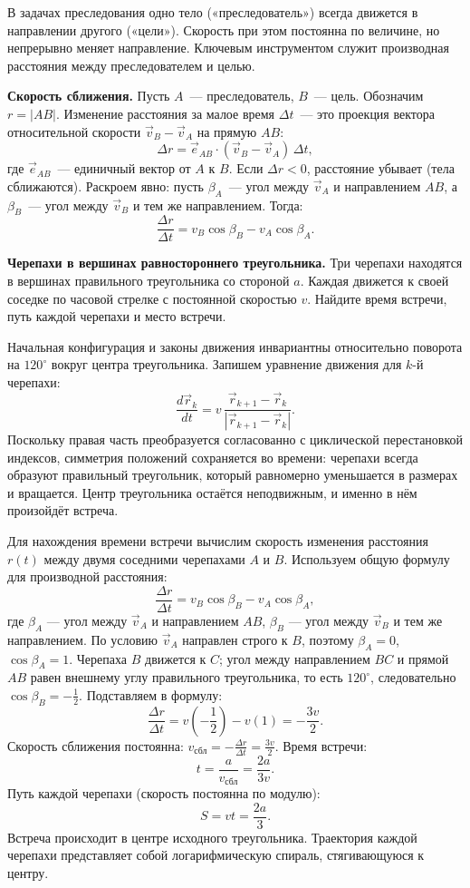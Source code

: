 \documentclass[../main.tex]{subfiles}
\begin{document}
В задачах преследования одно тело («преследователь») всегда движется
в направлении другого («цели»). Скорость при этом постоянна по величине,
но непрерывно меняет направление. Ключевым инструментом служит
производная расстояния между преследователем и целью.

\noindent\textbf{Скорость сближения.}
Пусть $A$~--- преследователь, $B$~--- цель. Обозначим $r = |AB|$.
Изменение расстояния за малое время $\Delta t$~--- это проекция вектора
относительной скорости $\vec{v}_B - \vec{v}_A$ на прямую $AB$:
\[
\Delta r = \vec{e}_{AB}\cdot(\vec{v}_B - \vec{v}_A)\,\Delta t,
\]
где $\vec{e}_{AB}$~--- единичный вектор от $A$ к $B$.
Если $\Delta r < 0$, расстояние убывает (тела сближаются).
Раскроем явно: пусть $\beta_A$~--- угол между $\vec{v}_A$ и направлением $AB$,
а $\beta_B$~--- угол между $\vec{v}_B$ и тем же направлением. Тогда:
\[
\frac{\Delta r}{\Delta t} = v_B\cos\beta_B - v_A\cos\beta_A.
\]

\begin{example}
\textbf{Черепахи в вершинах равностороннего треугольника.}
Три черепахи находятся в вершинах правильного треугольника со стороной $a$.
Каждая движется к своей соседке по часовой стрелке с постоянной скоростью $v$.
Найдите время встречи, путь каждой черепахи и место встречи.

Начальная конфигурация и законы движения инвариантны относительно поворота на $120^\circ$
вокруг центра треугольника. Запишем уравнение движения для $k$-й черепахи:
\[
\frac{d\vec{r}_k}{dt} = v\,\frac{\vec{r}_{k+1} - \vec{r}_k}{|\vec{r}_{k+1} - \vec{r}_k|}.
\]
Поскольку правая часть преобразуется согласованно с циклической перестановкой индексов,
симметрия положений сохраняется во времени: черепахи всегда образуют правильный треугольник,
который равномерно уменьшается в размерах и вращается. Центр треугольника остаётся
неподвижным, и именно в нём произойдёт встреча.

Для нахождения времени встречи вычислим скорость изменения расстояния $r(t)$ между
двумя соседними черепахами $A$ и $B$. Используем общую формулу для производной расстояния:
\[
\frac{\Delta r}{\Delta t} = v_B\cos\beta_B - v_A\cos\beta_A,
\]
где $\beta_A$ --- угол между $\vec{v}_A$ и направлением $AB$, $\beta_B$ --- угол между
$\vec{v}_B$ и тем же направлением. По условию $\vec{v}_A$ направлен строго к $B$,
поэтому $\beta_A = 0$, $\cos\beta_A = 1$. Черепаха $B$ движется к $C$; угол
между направлением $BC$ и прямой $AB$ равен внешнему углу правильного треугольника,
то есть $120^\circ$, следовательно $\cos\beta_B = -\frac{1}{2}$.
Подставляем в формулу:
\[
\frac{\Delta r}{\Delta t} = v\left(-\frac{1}{2}\right) - v(1) = -\frac{3v}{2}.
\]
Скорость сближения постоянна: $v_{\text{сбл}} = -\frac{\Delta r}{\Delta t} = \frac{3v}{2}$.
Время встречи:
\[
t = \frac{a}{v_{\text{сбл}}} = \frac{2a}{3v}.
\]
Путь каждой черепахи (скорость постоянна по модулю):
\[
S = v t = \frac{2a}{3}.
\]
Встреча происходит в центре исходного треугольника. Траектория каждой черепахи
представляет собой логарифмическую спираль, стягивающуюся к центру.
\end{example}
\end{document}
